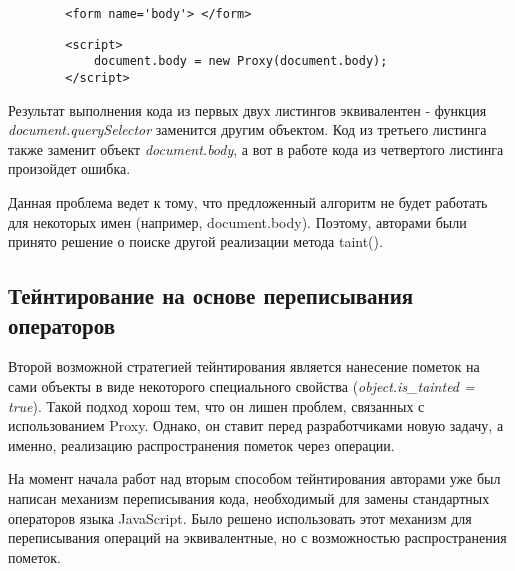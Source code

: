 	\begin{lstlisting}
		<form name='body'> </form>
	\end{lstlisting}

	\begin{lstlisting}
		<script>
			document.body = new Proxy(document.body);
		</script>
	\end{lstlisting}

	Результат выполнения кода из первых двух листингов эквивалентен - функция \textit{document.querySelector} заменится другим объектом. Код из третьего листинга также заменит объект \textit{document.body}, а вот в работе кода из четвертого листинга произойдет ошибка.


	Данная проблема ведет к тому, что предложенный алгоритм не будет работать для некоторых имен (например, document.body). Поэтому, авторами были принято решение о поиске другой реализации метода taint().

\subsection{Тейнтирование на основе переписывания операторов}
	Второй возможной стратегией тейнтирования является нанесение пометок на сами объекты в виде некоторого специального свойства (\textit{object.is\_tainted = true}). Такой подход хорош тем, что он лишен проблем, связанных с использованием Proxy. Однако, он ставит перед разработчиками новую задачу, а именно, реализацию распространения пометок через операции.


	На момент начала работ над вторым способом тейнтирования авторами уже был написан механизм переписывания кода, необходимый для замены стандартных операторов языка JavaScript. Было решено использовать этот механизм для переписывания операций на эквивалентные, но с возможностью распространения пометок. 


